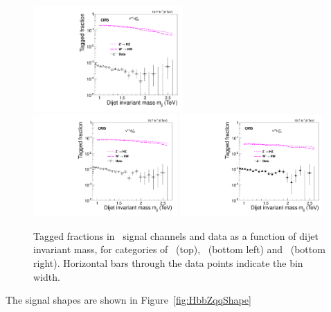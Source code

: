 \begin{figure}[ht!b]
\begin{center}
\includegraphics[width=0.51\textwidth]{EXO-14-009/HqqqqZqqfigs/Signal/HwwVqq-signal-taggingEff-8TeV.pdf}
\includegraphics[width=0.49\textwidth]{EXO-14-009/HqqqqZqqfigs/Signal/HwwVqq-signal-taggingEff-LowH-8TeV.pdf}
\includegraphics[width=0.49\textwidth]{EXO-14-009/HqqqqZqqfigs/Signal/HwwVqq-signal-taggingEff-LowV-8TeV.pdf}
\end{center}
\caption{
Tagged fractions in \HwwVqq\ signal channels and data as 
a function of dijet invariant mass, for categories of 
\HWWHP\ (top), \HWWLPH\ (bottom left) and \HWWLPV\ (bottom right). 
Horizontal bars
through the data points indicate the bin width. 
}
\label{fig:HwwEffAll}
\end{figure}



The signal shapes are shown in Figure~\ref{fig:HbbZqqShape} 

